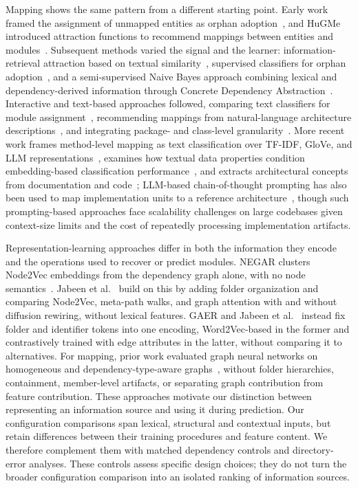 Mapping shows the same pattern from a different starting point. Early work framed the assignment of unmapped entities as orphan adoption~\cite{tzerpos1997orphan}, and HuGMe introduced attraction functions to recommend mappings between entities and modules~\cite{christl2005equipping,christl2007automated}. Subsequent methods varied the signal and the learner: information-retrieval attraction based on textual similarity~\cite{bittencourt_IR}, supervised classifiers for orphan adoption~\cite{bibi2016supervised}, and a semi-supervised Naive Bayes approach combining lexical and dependency-derived information through Concrete Dependency Abstraction~\cite{olsson2019semi,olsson2022automatically}. Interactive and text-based approaches followed, comparing text classifiers for module assignment~\cite{florean2021textclassifierscomparison}, recommending mappings from natural-language architecture descriptions~\cite{InMap}, and integrating package- and class-level granularity~\cite{sinkala2023integrated}. More recent work frames method-level mapping as text classification over TF-IDF, GloVe, and LLM representations~\cite{johansson2024mapping}, examines how textual data properties condition embedding-based classification performance~\cite{johansson2025mapping}, and extracts architectural concepts from documentation and code~\cite{fuchss2025enabling}; LLM-based chain-of-thought prompting has also been used to map implementation units to a reference architecture~\cite{rukmono_deductive}, though such prompting-based approaches face scalability challenges on large codebases given context-size limits and the cost of repeatedly processing implementation artifacts.

Representation-learning approaches differ in both the information they encode and the operations used to recover or predict modules. NEGAR clusters Node2Vec embeddings from the dependency graph alone, with no node semantics~\cite{negar}. Jabeen et al.~\cite{structsar} build on this by adding folder organization and comparing Node2Vec, meta-path walks, and graph attention with and without diffusion rewiring, without lexical features. GAER and Jabeen et al.~\cite{gaer,arl_2026} instead fix folder and identifier tokens into one encoding, Word2Vec-based in the former and contrastively trained with edge attributes in the latter, without comparing it to alternatives. For mapping, prior work evaluated graph neural networks on homogeneous and dependency-type-aware graphs~\cite{jabeen2025graph}, without folder hierarchies, containment, member-level artifacts, or separating graph contribution from feature contribution. These approaches motivate our distinction between representing an information source and using it during prediction. Our configuration comparisons span lexical, structural and contextual inputs, but retain differences between their training procedures and feature content. We therefore complement them with matched dependency controls and directory-error analyses. These controls assess specific design choices; they do not turn the broader configuration comparison into an isolated ranking of information sources.

